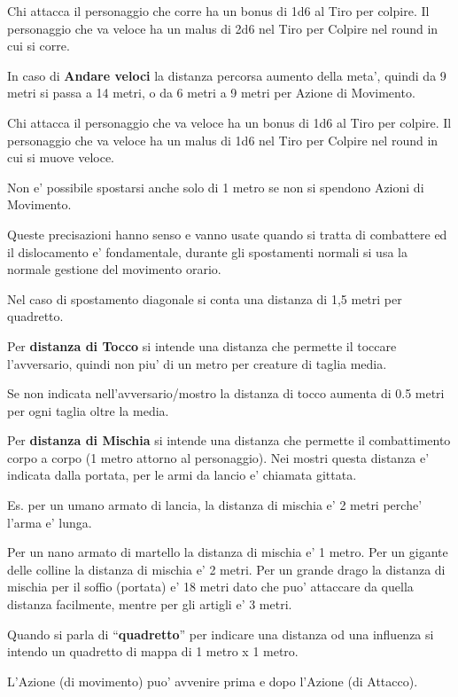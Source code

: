 \documentclass[a4paper,11pt,twoside,openany]{dndbook}
\begin{document}
Chi attacca il personaggio che corre ha un bonus di 1d6 al Tiro per colpire. Il personaggio che va veloce ha un malus di 2d6 nel Tiro per Colpire nel round in cui si corre.

In caso di \textbf{Andare veloci} la distanza percorsa aumento della meta', quindi da 9 metri si passa a 14 metri, o da 6 metri a 9 metri per Azione di Movimento.

Chi attacca il personaggio che va veloce ha un bonus di 1d6 al Tiro per colpire. Il personaggio che va veloce ha un malus di 1d6 nel Tiro per Colpire nel round in cui si muove veloce.

Non e' possibile spostarsi anche solo di 1 metro se non si spendono Azioni di Movimento.

Queste precisazioni hanno senso e vanno usate quando si tratta di combattere ed il dislocamento e' fondamentale, durante gli spostamenti normali si usa la normale gestione del movimento orario.

Nel caso di spostamento diagonale si conta una distanza di 1,5 metri per quadretto.

Per \textbf{distanza di Tocco}  si intende una distanza che permette il toccare l'avversario, quindi non piu' di un metro per creature di taglia media.

Se non indicata nell'avversario/mostro la distanza di tocco aumenta di 0.5 metri per ogni taglia oltre la media.

Per \textbf{distanza di Mischia}  si intende una distanza che permette il combattimento corpo a corpo (1 metro attorno al personaggio). Nei mostri questa distanza e' indicata dalla portata, per le armi da lancio e' chiamata gittata.

Es. per un umano armato di lancia, la distanza di mischia e' 2 metri perche' l'arma e' lunga.

Per un nano armato di martello la distanza di mischia e' 1 metro. Per un gigante delle colline la distanza di mischia e' 2 metri. Per un grande drago la distanza di mischia per il soffio (portata) e' 18 metri dato che puo' attaccare da quella distanza facilmente, mentre per gli artigli e' 3 metri.

Quando si parla di ``\textbf{quadretto}'' per indicare una distanza od una influenza si intendo un quadretto di mappa di 1 metro x 1 metro.

L'Azione (di movimento) puo' avvenire prima e dopo l'Azione (di Attacco).
\end{document}
